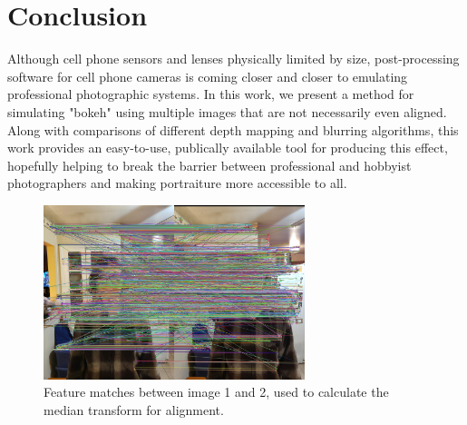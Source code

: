 \documentclass[10pt,twocolumn,letterpaper]{article}
\begin{document}
\section{Conclusion}

Although cell phone sensors and lenses physically limited by size, post-processing software for cell phone cameras is coming closer and closer to emulating professional photographic systems. In this work, we present a method for simulating "bokeh"
using multiple images that are not necessarily even aligned. Along with comparisons of different depth mapping and blurring algorithms, this work provides an easy-to-use, publically available tool for
producing this effect, hopefully helping to break the barrier between professional and hobbyist photographers and making portraiture more accessible to all.

\begin{figure}[!t]
    \begin{center}
        \includegraphics[width=3.0in]{bin/feature_matches.jpg} %
    \end{center}
    \caption{\small Feature matches between image 1 and 2, used to calculate the median transform for alignment.}
    \label{fig:features}
\end{figure}
\end{document}
